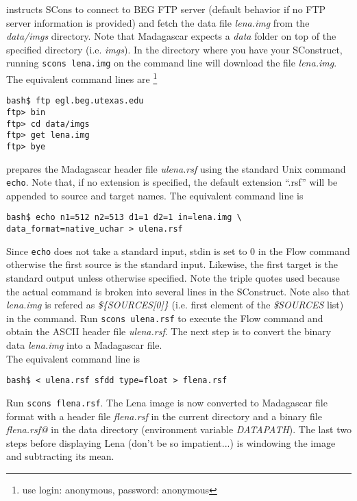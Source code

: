 
%
instructs SCons to connect to BEG FTP server (default behavior if no
FTP server information is provided) and fetch the data file
\textit{lena.img} from the \textit{data/imgs} directory. Note that
Madagascar expects a \textit{data} folder on top of the specified
directory (i.e.  \textit{imgs}). In the directory where you have your
SConstruct, running \texttt{scons lena.img} on the command line will
download the file \textit{lena.img}.  The equivalent command lines are
\footnote{use login: anonymous, password: anonymous}
\begin{verbatim}
bash$ ftp egl.beg.utexas.edu
ftp> bin
ftp> cd data/imgs
ftp> get lena.img
ftp> bye
\end{verbatim}
%

%
prepares the Madagascar header file \textit{ulena.rsf} using the
standard Unix command \texttt{echo}. Note that, if no extension is
specified, the default extension ``.rsf'' will be appended to source
and target names. The equivalent command line is
%
\begin{verbatim}
bash$ echo n1=512 n2=513 d1=1 d2=1 in=lena.img \
data_format=native_uchar > ulena.rsf
\end{verbatim}
%
Since \texttt{echo} does not take a standard input, stdin is set to 0
in the Flow command otherwise the first source is the standard input.
Likewise, the first target is the standard output unless otherwise
specified. Note the triple quotes used because the actual command is
broken into several lines in the SConstruct. Note also that
\textit{lena.img} is refered as \textit{\$\{SOURCES[0]\}} (i.e.  first
element of the \textit{\$SOURCES} list) in the command. Run
\texttt{scons ulena.rsf} to execute the Flow command and obtain the
ASCII header file \textit{ulena.rsf}.  The next step is to convert the
binary data \textit{lena.img} into a Madagascar file.\\


%
The equivalent command line is
%
\begin{verbatim}
bash$ < ulena.rsf sfdd type=float > flena.rsf
\end{verbatim}
%
Run \texttt{scons flena.rsf}. The Lena image is now converted to
Madagascar file format with a header file \textit{flena.rsf} in the
current directory and a binary file \textit{flena.rsf@} in the data
directory (environment variable \textit{DATAPATH}). The last two steps
before displaying Lena (don't
be so impatient...)  is windowing the image and subtracting its mean.\\

